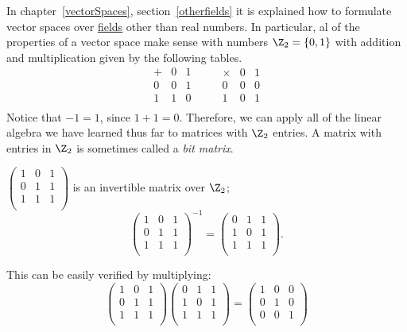 In chapter~\ref{vectorSpaces}, section~\ref{otherfields} it is explained how to formulate vector spaces over \hyperref[fields]{fields} other than real numbers.
In particular, al of the properties of a 
vector space make sense with numbers $\Z_2=\{0,1 \}$ with addition and multiplication given by the following tables. 
\label{Z2}
\[
\begin{array}{c|cc}
+ & 0 & 1 \\ \hline
0 & 0 & 1 \\
1 & 1 & 0 \\
\end{array}
\qquad
\begin{array}{c|cc}
\times& 0 & 1 \\ \hline
0 & 0 & 0 \\
1 & 0 & 1 \\
\end{array}
\]
Notice that $-1=1$, since $1+1=0$.
Therefore,  we can apply all of the linear algebra we have learned thus far to matrices with $\Z_2$ entries.  A matrix with entries in $\Z_2$ is sometimes called a \emph{bit matrix}.

\begin{example}
$\begin{pmatrix}
1 & 0 & 1 \\
0 & 1 & 1 \\
1 & 1 & 1 \\
\end{pmatrix}$ is an invertible matrix over $\Z_2$;
\[\begin{pmatrix}
1 & 0 & 1 \\
0 & 1 & 1 \\
1 & 1 & 1 \\
\end{pmatrix}^{-1}=\begin{pmatrix}
0 & 1 & 1 \\
1 & 0 & 1 \\
1 & 1 & 1 \\
\end{pmatrix}.
\]

This can be easily verified by multiplying:
\[\begin{pmatrix}
1 & 0 & 1 \\
0 & 1 & 1 \\
1 & 1 & 1 \\
\end{pmatrix}\begin{pmatrix}
0 & 1 & 1 \\
1 & 0 & 1 \\
1 & 1 & 1 \\
\end{pmatrix}=\begin{pmatrix}
1 & 0 & 0 \\
0 & 1 & 0 \\
0 & 0 & 1 \\
\end{pmatrix}
\]
\end{example}

